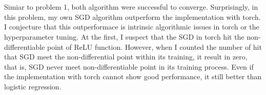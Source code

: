 \documentclass[10pt]{article}
\begin{document}
\section{}
Simiar to problem 1, both algorithm were successful to converge. Surprisingly, in this problem, my own SGD algorithm outperform the implementation with torch.
I conjecture that this outperformace is intrinsic algorithmic issues in torch or the hyperparameter tuning. At the first, I suspect that the SGD in torch hit the non-differentiable point of ReLU function.
However, when I counted the number of hit that SGD meet the non-differential point within its training, it result in zero, that is, SGD never meet non-differentiable point in its training process. 
Even if the implementation with torch cannot show good performance, 
it still better than logistic regression.
\end{document}
